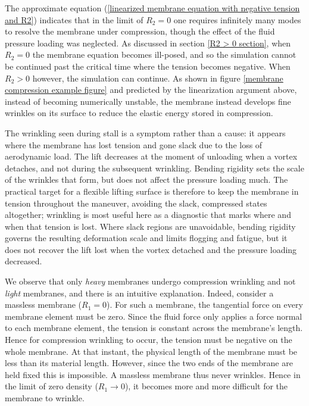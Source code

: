 \documentclass{article}[12pt]
\theoremstyle{Theorem}
\begin{document}
The approximate equation (\ref{linearized membrane equation with negative tension and R2}) indicates that in the limit of $R_2 = 0$ one requires infinitely many modes to resolve the membrane under compression, though the effect of the fluid pressure loading was neglected. As discussed in section \ref{R2 > 0 section}, when $R_2 = 0$ the membrane equation becomes ill-posed, and so the simulation cannot be continued past the critical time where the tension becomes negative. When $R_2 > 0$ however, the simulation can continue. As shown in figure \ref{membrane compression example figure} and predicted by the linearization argument above, instead of becoming numerically unstable, the membrane instead develops fine wrinkles on its surface to reduce the elastic energy stored in compression. 
\newline

The wrinkling seen during stall is a symptom rather than a cause: it appears where the membrane has lost tension and gone slack due to the loss of aerodynamic load. The lift decreases at the moment of unloading when a vortex detaches, and not during the subsequent wrinkling. Bending rigidity sets the scale of the wrinkles that form, but does not affect the pressure loading much. The practical target for a flexible lifting surface is therefore to keep the membrane in tension throughout the maneuver, avoiding the slack, compressed states altogether; wrinkling is most useful here as a diagnostic that marks where and when that tension is lost. Where slack regions are unavoidable, bending rigidity governs the resulting deformation scale and limits flogging and fatigue, but it does not recover the lift lost when the vortex detached and the pressure loading decreased.
\newline

We observe that only \textit{heavy} membranes undergo compression wrinkling and not \textit{light} membranes, and there is an intuitive explanation. Indeed, consider a massless membrane ($R_1 =0$). For such a membrane, the tangential force on every membrane element must be zero. Since the fluid force only applies a force normal to each membrane element, the tension is constant across the membrane's length. Hence for compression wrinkling to occur, the tension must be negative on the whole membrane. At that instant, the physical length of the membrane must be less than its material length. However, since the two ends of the membrane are held fixed this is impossible. A massless membrane thus never wrinkles. Hence in the limit of zero density ($R_1 \rightarrow 0$), it becomes more and more difficult for the membrane to wrinkle.
\newline
\end{document}
